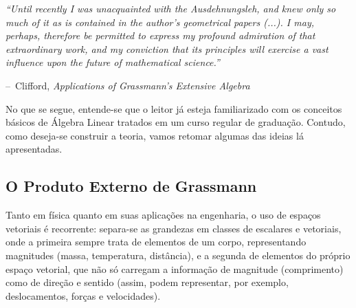 \documentclass[a4paper,12pt]{report}
\makeatletter
\theoremstyle{plain}
\theoremstyle{definition}
\newenvironment{chapquote}[2][2em]
{\setlength{\@tempdima}{#1}%
	\def\chapquote@author{#2}%
	\parshape 1 \@tempdima \dimexpr\textwidth-2\@tempdima\relax%
	\itshape}
{\par\normalfont\hfill--\ \chapquote@author\hspace*{\@tempdima}\par\bigskip}
\makeatother
\begin{document}
	
	\begin{chapquote}{Clifford, \textit{Applications of Grassmann's Extensive Algebra} \cite{cliffordApplicationsGrassmannAlgebras}}
		``Until recently I was unacquainted with the Ausdehnungsleh, and knew only so much of it as is contained in the author's geometrical papers (...). I may, perhaps, therefore be permitted to express my profound admiration of that extraordinary work, and my conviction that its principles will exercise a vast influence upon the future of mathematical science.''
	\end{chapquote}

	No que se segue, entende-se que o leitor já esteja familiarizado com os conceitos básicos de Álgebra Linear tratados em um curso regular de graduação. Contudo, como deseja-se construir a teoria, vamos retomar algumas das ideias lá apresentadas. 
	
	\subsection{O Produto Externo de Grassmann}
	
	Tanto em física quanto em suas aplicações na engenharia, o uso de espaços vetoriais é recorrente: separa-se as grandezas em classes de escalares e vetoriais, onde a primeira sempre trata de elementos de um corpo, representando magnitudes (massa, temperatura, distância), e a segunda de elementos do próprio espaço vetorial, que não só carregam a informação de magnitude (comprimento) como de direção e sentido (assim, podem representar, por exemplo, deslocamentos, forças e velocidades).
	
\end{document}
